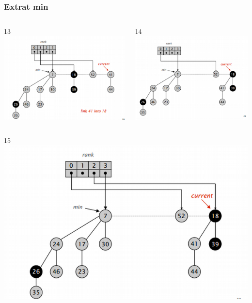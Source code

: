 \documentclass{beamer}
\begin{document}
   
 \begin{frame}
 \frametitle{Extrat min}
 \begin{columns}[t]
 13
    \includegraphics[width =1 \textwidth]{imagenes/delete13.png}
      
    14
    \includegraphics[width =1 \textwidth]{imagenes/delete14.png}

   \end{columns}
   \begin{columns}[t]
   15
    \includegraphics[width =1 \textwidth]{imagenes/delete15.png}
      

\end{columns}
\end{frame}
\end{document}
